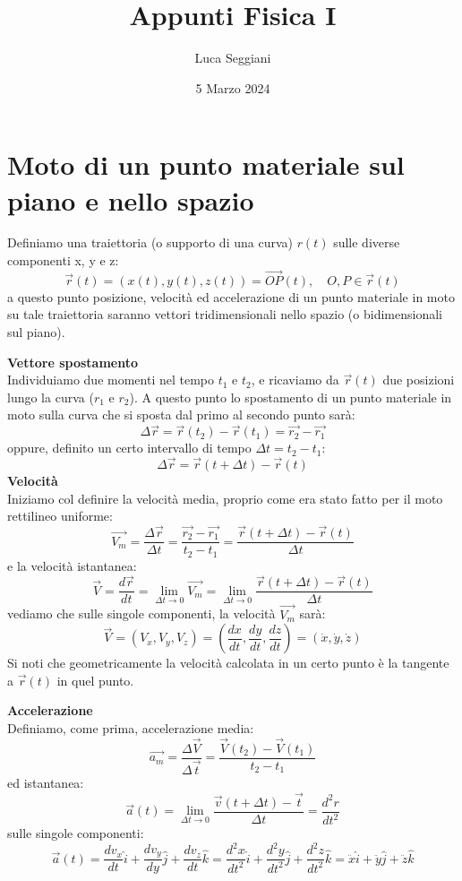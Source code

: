 \documentclass[a4paper,12pt]{article}
\title{Appunti Fisica I}
\author{Luca Seggiani}
\date{5 Marzo 2024}
\begin{document}
\maketitle
\section{Moto di un punto materiale sul piano e nello spazio}
Definiamo una traiettoria (o supporto di una curva) $r(t)$ sulle diverse componenti x, y e z:
$$ \vec{r}(t) = (x(t), y(t), z(t)) = \vec{OP}(t), \quad O, P \in \vec{r}(t) $$
a questo punto posizione, velocità ed accelerazione di un punto materiale in moto su tale traiettoria
saranno vettori tridimensionali nello spazio (o bidimensionali sul piano).
\par\smallskip
\textbf{Vettore spostamento} \\
Individuiamo due momenti nel tempo $t_1$ e $t_2$, e ricaviamo da $\vec{r}(t)$ due posizioni lungo la curva
($r_1$ e $r_2$). A questo punto lo spostamento di un punto materiale in moto sulla curva che si sposta dal 
primo al secondo punto sarà:
$$ \Delta \vec{r} = \vec{r}(t_2) - \vec{r}(t_1) = \vec{r_2} - \vec{r_1} $$
oppure, definito un certo intervallo di tempo $\Delta t = t_2 - t_1$:
$$ \Delta \vec{r} = \vec{r}(t + \Delta t) - \vec{r}(t) $$
\textbf{Velocità} \\
Iniziamo col definire la velocità media, proprio come era stato fatto per il moto rettilineo uniforme:
$$ \vec{V_m} = \frac{\Delta \vec{r}}{\Delta t} = \frac{\vec{r_2} - \vec{r_1}}{t_2 - t_1}
= \frac{\vec{r}(t + \Delta t) - \vec{r}(t)}{\Delta t} $$
e la velocità istantanea:
$$ \vec{V} = \frac{d\vec{r}}{dt} = \lim_{\Delta t \rightarrow 0} \vec{V_m} = 
\lim_{\Delta t \rightarrow 0} \frac{\vec{r}(t + \Delta t) - \vec{r}(t)}{\Delta t}$$
vediamo che sulle singole componenti, la velocità $\vec{V_m}$ sarà:
$$ \vec{V} = (V_x, V_y, V_z) = (\frac{dx}{dt}, \frac{dy}{dt}, \frac{dz}{dt}) = (\dot{x}, \dot{y}, \dot{z}) $$
Si noti che geometricamente la velocità calcolata in un certo punto è la tangente a $\vec{r}(t)$ in quel punto.
\par\smallskip
\textbf{Accelerazione} \\
Definiamo, come prima, accelerazione media:
$$ \vec{a_m} = \frac{\Delta \vec{V}}{\Delta \vec{t}} = \frac{\vec{V}(t_2) - \vec{V}(t_1)}{t_2-t_1} $$
ed istantanea:
$$ \vec{a}(t) = \lim_{\Delta t \rightarrow 0} \frac{\vec{v}(t + \Delta t) - \vec{t}}{\Delta t} = \frac{d^2r}{dt^2} $$
sulle singole componenti:
$$ \vec{a}(t) = \frac{dv_x}{dt}\hat{i} + \frac{dv_y}{dy}\hat{j} + \frac{dv_z}{dt}\hat{k}
= \frac{d^2x}{dt^2}\hat{i} + \frac{d^2y}{dt^2}\hat{j} +\frac{d^2z}{dt^2}\hat{k} = \ddot{x}\hat{i} + \ddot{y}\hat{j} + \ddot{z}\hat{k} $$
\end{document}
